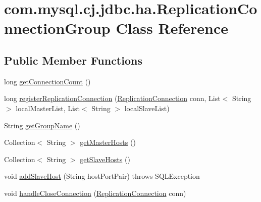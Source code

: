 \hypertarget{classcom_1_1mysql_1_1cj_1_1jdbc_1_1ha_1_1_replication_connection_group}{}\section{com.\+mysql.\+cj.\+jdbc.\+ha.\+Replication\+Connection\+Group Class Reference}
\label{classcom_1_1mysql_1_1cj_1_1jdbc_1_1ha_1_1_replication_connection_group}
\subsection*{Public Member Functions}
\begin{DoxyCompactItemize}
\item 
long \mbox{\hyperlink{classcom_1_1mysql_1_1cj_1_1jdbc_1_1ha_1_1_replication_connection_group_a6e9dca65e606501a5c538e52026d85b6}{get\+Connection\+Count}} ()
\item 
long \mbox{\hyperlink{classcom_1_1mysql_1_1cj_1_1jdbc_1_1ha_1_1_replication_connection_group_a3071d0f8628bcc858c1043648dfa5cc6}{register\+Replication\+Connection}} (\mbox{\hyperlink{interfacecom_1_1mysql_1_1cj_1_1jdbc_1_1ha_1_1_replication_connection}{Replication\+Connection}} conn, List$<$ String $>$ local\+Master\+List, List$<$ String $>$ local\+Slave\+List)
\item 
String \mbox{\hyperlink{classcom_1_1mysql_1_1cj_1_1jdbc_1_1ha_1_1_replication_connection_group_a8a41769fe2c58ca69d5c81c8e46bfac4}{get\+Group\+Name}} ()
\item 
Collection$<$ String $>$ \mbox{\hyperlink{classcom_1_1mysql_1_1cj_1_1jdbc_1_1ha_1_1_replication_connection_group_ada95a698bb8c8006815c471771574f74}{get\+Master\+Hosts}} ()
\item 
Collection$<$ String $>$ \mbox{\hyperlink{classcom_1_1mysql_1_1cj_1_1jdbc_1_1ha_1_1_replication_connection_group_a5698926580f2370aaf7cf64460826efb}{get\+Slave\+Hosts}} ()
\item 
void \mbox{\hyperlink{classcom_1_1mysql_1_1cj_1_1jdbc_1_1ha_1_1_replication_connection_group_af6b5ef78b532f8eb4cf0529d482076f3}{add\+Slave\+Host}} (String host\+Port\+Pair)  throws S\+Q\+L\+Exception 
\item 
void \mbox{\hyperlink{classcom_1_1mysql_1_1cj_1_1jdbc_1_1ha_1_1_replication_connection_group_a62b72dc65b8fc6e2399f2812e3ae75fd}{handle\+Close\+Connection}} (\mbox{\hyperlink{interfacecom_1_1mysql_1_1cj_1_1jdbc_1_1ha_1_1_replication_connection}{Replication\+Connection}} conn)

\end{DoxyCompactItemize}
